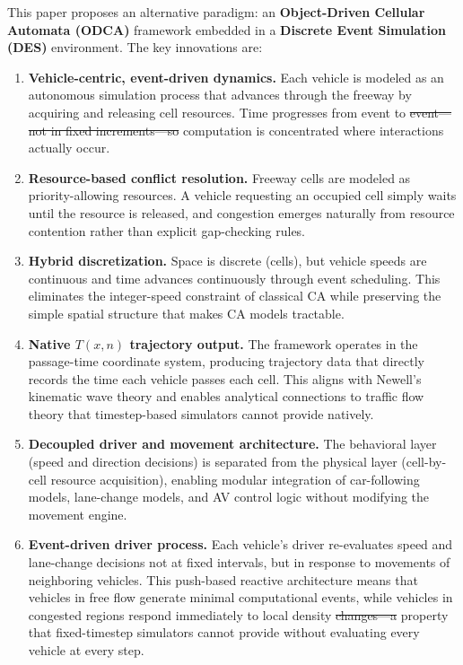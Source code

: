 \documentclass[review,authoryear]{elsarticle}
\providecommand{\DIFaddtex}[1]{{\protect\color{blue}\uwave{#1}}} %
\providecommand{\DIFdeltex}[1]{{\protect\color{red}\sout{#1}}}                      %
\providecommand{\DIFaddbegin}{} %
\providecommand{\DIFaddend}{} %
\providecommand{\DIFdelbegin}{} %
\providecommand{\DIFdelend}{} %
\providecommand{\DIFadd}[1]{\texorpdfstring{\DIFaddtex{#1}}{#1}} %
\providecommand{\DIFdel}[1]{\texorpdfstring{\DIFdeltex{#1}}{}} %
\newcommand{\DIFscaledelfig}{0.5}
\newlength{\DIFdelgraphicswidth} %
\newlength{\DIFdelgraphicsheight} %
\newcommand{\DIFaddincludegraphics}[2][]{{\color{blue}\fbox{\DIFOincludegraphics[#1]{#2}}}} %
\newcommand{\DIFdelincludegraphics}[2][]{%
\sbox{\DIFdelgraphicsbox}{\DIFOincludegraphics[#1]{#2}}%
\settoboxwidth{\DIFdelgraphicswidth}{\DIFdelgraphicsbox} %
\settoboxtotalheight{\DIFdelgraphicsheight}{\DIFdelgraphicsbox} %
\scalebox{\DIFscaledelfig}{%
\parbox[b]{\DIFdelgraphicswidth}{\usebox{\DIFdelgraphicsbox}\\[-\baselineskip] \rule{\DIFdelgraphicswidth}{0em}}\llap{\resizebox{\DIFdelgraphicswidth}{\DIFdelgraphicsheight}{%
\setlength{\unitlength}{\DIFdelgraphicswidth}%
\begin{picture}(1,1)%
\thicklines\linethickness{2pt} %
{\color[rgb]{1,0,0}\put(0,0){\framebox(1,1){}}}%
{\color[rgb]{1,0,0}\put(0,0){\line( 1,1){1}}}%
{\color[rgb]{1,0,0}\put(0,1){\line(1,-1){1}}}%
\end{picture}%
}\hspace*{3pt}}} %
} %
\DeclareRobustCommand{\DIFaddbegin}{\DIFOaddbegin \let\includegraphics\DIFaddincludegraphics} %
\DeclareRobustCommand{\DIFaddend}{\DIFOaddend \let\includegraphics\DIFOincludegraphics} %
\DeclareRobustCommand{\DIFdelbegin}{\DIFOdelbegin \let\includegraphics\DIFdelincludegraphics} %
\DeclareRobustCommand{\DIFdelend}{\DIFOaddend \let\includegraphics\DIFOincludegraphics} %
\begin{document}
This paper proposes an alternative paradigm: an \textbf{Object-Driven Cellular Automata (ODCA)} framework embedded in a \textbf{Discrete Event Simulation (DES)} environment. The key innovations are:

\begin{enumerate}
    \item \textbf{Vehicle-centric, event-driven dynamics.} Each vehicle is modeled as an autonomous simulation process that advances through the freeway by acquiring and releasing cell resources. Time progresses from event to \DIFdelbegin \DIFdel{event---not in fixed increments---so }\DIFdelend \DIFaddbegin \DIFadd{event, not in fixed increments, so }\DIFaddend computation is concentrated where interactions actually occur.

    \item \textbf{Resource-based conflict resolution.} Freeway cells are modeled as priority-allowing resources. A vehicle requesting an occupied cell simply waits until the resource is released, and congestion emerges naturally from resource contention rather than explicit gap-checking rules.

    \item \textbf{Hybrid discretization.} Space is discrete (cells), but vehicle speeds are continuous and time advances continuously through event scheduling. This eliminates the integer-speed constraint of classical CA while preserving the simple spatial structure that makes CA models tractable.

    \item \textbf{Native $T(x,n)$ trajectory output.} The framework operates in the passage-time coordinate system, producing trajectory data that directly records the time each vehicle passes each cell. This aligns with Newell's kinematic wave theory \citep{newell1993simplified} and enables analytical connections to traffic flow theory that timestep-based simulators cannot provide natively.

    \item \textbf{Decoupled driver and movement architecture.} The behavioral layer (speed and direction decisions) is separated from the physical layer (cell-by-cell resource acquisition), enabling modular integration of car-following models, lane-change models, and AV control logic without modifying the movement engine.

    \item \textbf{Event-driven driver process.} Each vehicle's driver re-evaluates speed and lane-change decisions not at fixed intervals, but in response to movements of neighboring vehicles. This push-based reactive architecture means that vehicles in free flow generate minimal computational events, while vehicles in congested regions respond immediately to local density \DIFdelbegin \DIFdel{changes---a }\DIFdelend \DIFaddbegin \DIFadd{changes, a }\DIFaddend property that fixed-timestep simulators cannot provide without evaluating every vehicle at every step.


\end{enumerate}
\end{document}
